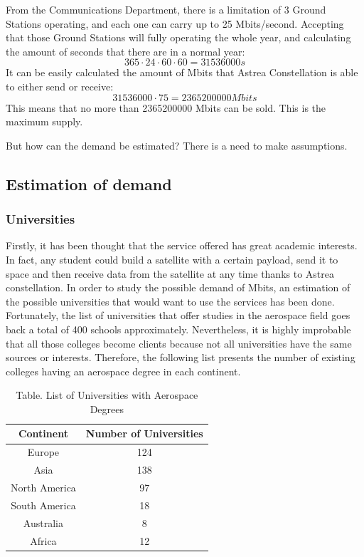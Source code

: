 From the Communications Department, there is a limitation of 3 Ground Stations operating, and each one can carry up to 25 Mbits/second. Accepting that those Ground Stations will fully operating the whole year, and calculating the amount of seconds that there are in a normal year:
\begin{equation}
365 \cdot 24 \cdot 60 \cdot 60 = 31536000 s
\end{equation}
It can be easily calculated the amount of Mbits that Astrea Constellation is able to either send or receive:
\begin{equation}
31536000 \cdot 75 = 2365200000 Mbits
\end{equation}
This means that no more than 2365200000 Mbits can be sold. This is the maximum supply.

But how can the demand be estimated? There is a need to make assumptions. 

\subsection{Estimation of demand}

\subsubsection{Universities}

Firstly, it has been thought that the service offered has great academic interests. In fact, any student could build a satellite with a certain payload, send it to space and then receive data from the satellite at any time thanks to Astrea constellation. 
\newline
\newline
In order to study the possible demand of Mbits, an estimation of the possible universities that would want to use the services has been done. Fortunately, the list of universities that offer studies in the aerospace field goes back a total of 400 schools approximately. Nevertheless, it is highly improbable that all those colleges become clients because not all universities have the same sources or interests. Therefore, the following list presents the number of existing colleges having an aerospace degree in each continent.

	\begin{table}[!h]
	\begin{center}
	\begin{tabular}{|c|c|}
	\bf{Continent} & \bf{Number of Universities}\\
	\hline 
	Europe & 124\\
	\hline 
	Asia & 138\\
	\hline 
	North America &  97\\
	\hline
	 South America & 18\\
	\hline 
	Australia & 8\\
	\hline 
	Africa & 12\\
	\end{tabular}
	\end{center}
	\caption{Table. List of Universities with Aerospace Degrees}
	\end{table} 	

